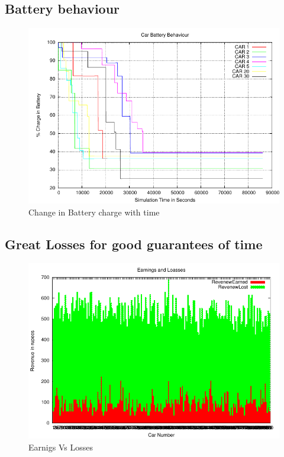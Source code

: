\documentclass[11pt]{report}
\begin{document}
\begin{itemize}
\subsection{ Battery behaviour }
\begin{figure}[h!t]
\centering
\includegraphics[scale=0.9]{../plots/carsBatteryPower}
\caption{Change in Battery charge with time}\label{fig:SVM}
\end{figure}

\subsection{ Great Losses for good guarantees of time }
\begin{figure}[h!t]
\centering
\includegraphics[scale=0.9]{../plots/EarnngsVsLosses}
\caption{Earnigs Vs Losses}\label{fig:SVM}
\end{figure}






\end{itemize}
\end{document}
